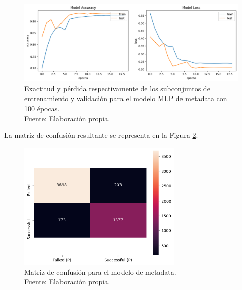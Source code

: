 \begin{figure}[!ht]
	\begin{center}
		\includegraphics[width=1\textwidth]{5/figures/metadata_model_acc_loss.png}
		\caption[Exactitud y pérdida respectivamente de los subconjuntos de entrenamiento y validación para el modelo MLP de metadata con 100 épocas]{Exactitud y pérdida respectivamente de los subconjuntos de entrenamiento y validación para el modelo MLP de metadata con 100 épocas.\\
		Fuente: Elaboración propia.}
		\label{5:fig1}
	\end{center}
\end{figure}

La matriz de confusión resultante se representa en la Figura \ref{5:fig2}.

\begin{figure}[!ht]
	\begin{center}
		\includegraphics[width=0.70\textwidth]{5/figures/metadata_confusion_matrix.png}
		\caption[Matriz de confusión para el modelo de metadata]{Matriz de confusión para el modelo de metadata.\\
		Fuente: Elaboración propia.}
		\label{5:fig2}
		\vspace{-0.5cm}
	\end{center}
\end{figure}


